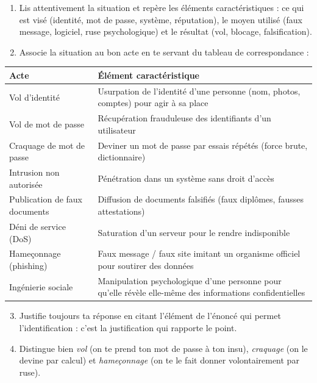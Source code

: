 \documentclass[11pt]{article}
\begin{document}
\begin{methode}
\begin{enumerate}
  \item Lis attentivement la situation et repère les éléments caractéristiques : ce qui est visé (identité, mot de passe, système, réputation), le moyen utilisé (faux message, logiciel, ruse psychologique) et le résultat (vol, blocage, falsification).
  \item Associe la situation au bon acte en te servant du tableau de correspondance :
\end{enumerate}
\begin{center}
\begin{tabularx}{\linewidth}{|l|X|}
\hline
\rowcolor{popblueL} \textbf{Acte} & \textbf{Élément caractéristique} \\
\hline
Vol d'identité & Usurpation de l'identité d'une personne (nom, photos, comptes) pour agir à sa place \\
\hline
Vol de mot de passe & Récupération frauduleuse des identifiants d'un utilisateur \\
\hline
Craquage de mot de passe & Deviner un mot de passe par essais répétés (force brute, dictionnaire) \\
\hline
Intrusion non autorisée & Pénétration dans un système sans droit d'accès \\
\hline
Publication de faux documents & Diffusion de documents falsifiés (faux diplômes, fausses attestations) \\
\hline
Déni de service (DoS) & Saturation d'un serveur pour le rendre indisponible \\
\hline
Hameçonnage (phishing) & Faux message / faux site imitant un organisme officiel pour soutirer des données \\
\hline
Ingénierie sociale & Manipulation psychologique d'une personne pour qu'elle révèle elle-même des informations confidentielles \\
\hline
\end{tabularx}
\end{center}
\begin{enumerate}
  \setcounter{enumi}{2}
  \item Justifie toujours ta réponse en citant l'élément de l'énoncé qui permet l'identification : c'est la justification qui rapporte le point.
  \item Distingue bien \emph{vol} (on te prend ton mot de passe à ton insu), \emph{craquage} (on le devine par calcul) et \emph{hameçonnage} (on te le fait donner volontairement par ruse).
\end{enumerate}
\end{methode}
\end{document}
